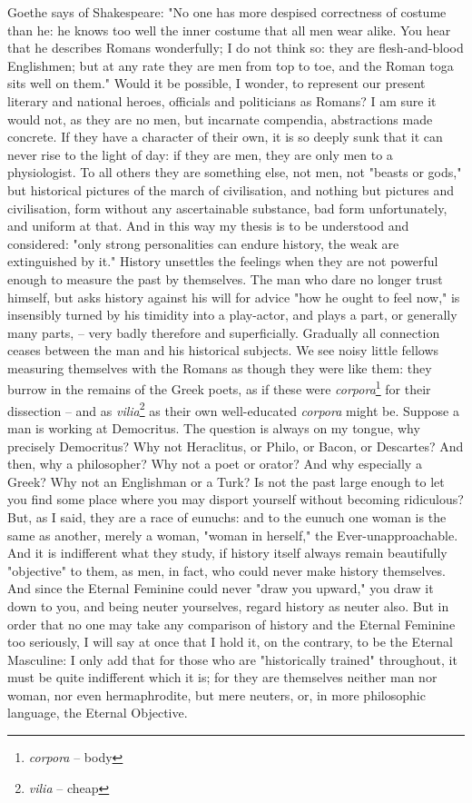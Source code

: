 Goethe says of Shakespeare: "No one has more despised correctness of
costume than he: he knows too well the inner costume that all men
wear alike. You hear that he describes Romans wonderfully; I do not
think so: they are flesh-and-blood Englishmen; but at any rate they
are men from top to toe, and the Roman toga sits well on them." Would
it be possible, I wonder, to represent our present literary and
national heroes, officials and politicians as Romans? I am sure it
would not, as they are no men, but incarnate compendia, abstractions
made concrete. If they have a character of their own, it is so deeply
sunk that it can never rise to the light of day: if they are men,
they are only men to a physiologist. To all others they are something
else, not men, not "beasts or gods," but historical pictures of the
march of civilisation, and nothing but pictures and civilisation,
form without any ascertainable substance, bad form unfortunately, and
uniform at that. And in this way my thesis is to be understood and
considered: "only strong personalities can endure history, the weak
are extinguished by it." History unsettles the feelings when they are
not powerful enough to measure the past by themselves. The man who
dare no longer trust himself, but asks history against his will for
advice "how he ought to feel now," is insensibly turned by his
timidity into a play-actor, and plays a part, or generally many
parts, -- very badly therefore and superficially. Gradually all
connection ceases between the man and his historical subjects. We see
noisy little fellows measuring themselves with the Romans as though
they were like them: they burrow in the remains of the Greek poets,
as if these were \textit{corpora}\footnote{\textit{corpora}  --  body} for their dissection -- and as \textit{vilia}\footnote{\textit{vilia} -- cheap} as
their own well-educated \textit{corpora} might be. Suppose a man is working
at Democritus. The question is always on my tongue, why precisely
Democritus? Why not Heraclitus, or Philo, or Bacon, or Descartes? And
then, why a philosopher? Why not a poet or orator? And why especially
a Greek? Why not an Englishman or a Turk? Is not the past large
enough to let you find some place where you may disport yourself
without becoming ridiculous? But, as I said, they are a race of
eunuchs: and to the eunuch one woman is the same as another, merely a
woman, "woman in herself," the Ever-unapproachable. And it is
indifferent what they study, if history itself always remain
beautifully "objective" to them, as men, in fact, who could never
make history themselves. And since the Eternal Feminine could never
"draw you upward," you draw it down to you, and being neuter
yourselves, regard history as neuter also. But in order that no one
may take any comparison of history and the Eternal Feminine too
seriously, I will say at once that I hold it, on the contrary, to be
the Eternal Masculine: I only add that for those who are
"historically trained" throughout, it must be quite indifferent which
it is; for they are themselves neither man nor woman, nor even
hermaphrodite, but mere neuters, or, in more philosophic language,
the Eternal Objective.

